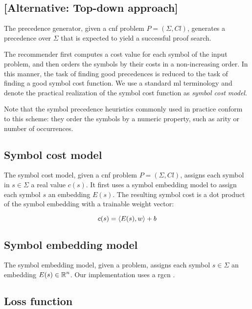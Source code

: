 
\subsection{[Alternative: Top-down approach]}

The precedence generator, given a \gls{cnf} problem $P = (\Sigma, \mathit{Cl})$,
generates a precedence over $\Sigma$
that is expected to yield a successful proof search.

The recommender first computes a cost value for each symbol of the input problem,
and then orders the symbols by their costs in a non-increasing order.
In this manner, the task of finding good precedences is reduced to the task
of finding a good symbol cost function.
We use a standard \gls{ml} terminology and denote
the practical realization of the symbol cost function as \emph{symbol cost model}.

Note that the symbol precedence heuristics commonly used in practice
conform to this scheme:
they order the symbols by a numeric property, such as arity or number of occurrences.

\subsection{Symbol cost model}

The symbol cost model, given a \gls{cnf} problem $P = (\Sigma, \mathit{Cl})$,
assigns each symbol in $s \in \Sigma$ a real value $c(s)$.
It first uses a symbol embedding model to assign each symbol $s$ an embedding $E(s)$.
The resulting symbol cost is a dot product of the symbol embedding with a trainable weight vector:

$$
c(s) = \left<E(s),w\right> + b
$$

\subsection{Symbol embedding model}

The symbol embedding model, given a problem,
assigns each symbol $s \in \Sigma$ an embedding $E(s) \in \operatorname{\mathbb{R}}^n$.
Our implementation uses a \gls{rgcn} \cite{}.


\subsection{Loss function}

